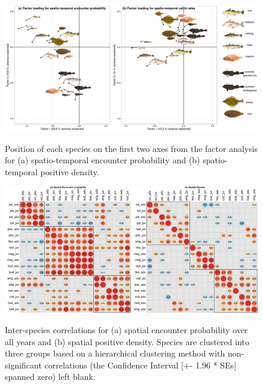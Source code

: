 \documentclass{nature}
\begin{document}
\begin{figure}
\begin{center}
	\includegraphics[width=\linewidth]{"figures/Figure 3 - PCAstyle_Plots_SpatioTemp"}
	\label{fig:2}
	\caption{Position of each species on the first two axes from the
		factor analysis for (a) spatio-temporal encounter probability
		and (b) spatio-temporal positive density.}
\end{center}
\end{figure}

\begin{figure}
\begin{center}
	\includegraphics[width = \linewidth]{"figures/Figure 1 - Omega1Omega2_Correlations_blank"}
	\label{fig:3}
	\caption{Inter-species correlations for (a) spatial encounter
		probability over all years and (b) spatial positive density.
		Species are clustered into three groups based on a
		hierarchical clustering method with non-significant
		correlations (the Confidence Interval [+- 1.96 * SEs] spanned
		zero) left blank.}
	\end{center}
\end{figure}
\end{document}
